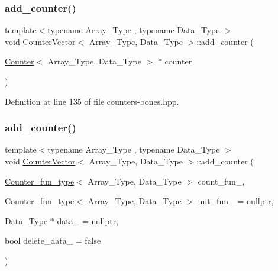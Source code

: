 \subsubsection{\texorpdfstring{add\+\_\+counter()}{add\_counter()}\hspace{0.1cm}{\footnotesize\ttfamily [2/3]}}
{\footnotesize\ttfamily template$<$typename Array\+\_\+\+Type , typename Data\+\_\+\+Type $>$ \\
void \hyperlink{class_counter_vector}{Counter\+Vector}$<$ Array\+\_\+\+Type, Data\+\_\+\+Type $>$\+::add\+\_\+counter (\begin{DoxyParamCaption}\item[{\hyperlink{class_counter}{Counter}$<$ Array\+\_\+\+Type, Data\+\_\+\+Type $>$ $\ast$}]{counter }\end{DoxyParamCaption})\hspace{0.3cm}{\ttfamily [inline]}}



Definition at line 135 of file counters-\/bones.\+hpp.

\mbox{\label{class_counter_vector_adb32ff1af45bc05a292a5cb064dc414d}} 
\subsubsection{\texorpdfstring{add\+\_\+counter()}{add\_counter()}\hspace{0.1cm}{\footnotesize\ttfamily [3/3]}}
{\footnotesize\ttfamily template$<$typename Array\+\_\+\+Type , typename Data\+\_\+\+Type $>$ \\
void \hyperlink{class_counter_vector}{Counter\+Vector}$<$ Array\+\_\+\+Type, Data\+\_\+\+Type $>$\+::add\+\_\+counter (\begin{DoxyParamCaption}\item[{\hyperlink{typedefs_8hpp_ac0160f52f564dea3ac033b374cffbfe7}{Counter\+\_\+fun\+\_\+type}$<$ Array\+\_\+\+Type, Data\+\_\+\+Type $>$}]{count\+\_\+fun\+\_\+,  }\item[{\hyperlink{typedefs_8hpp_ac0160f52f564dea3ac033b374cffbfe7}{Counter\+\_\+fun\+\_\+type}$<$ Array\+\_\+\+Type, Data\+\_\+\+Type $>$}]{init\+\_\+fun\+\_\+ = {\ttfamily nullptr},  }\item[{Data\+\_\+\+Type $\ast$}]{data\+\_\+ = {\ttfamily nullptr},  }\item[{bool}]{delete\+\_\+data\+\_\+ = {\ttfamily false} }\end{DoxyParamCaption})}



